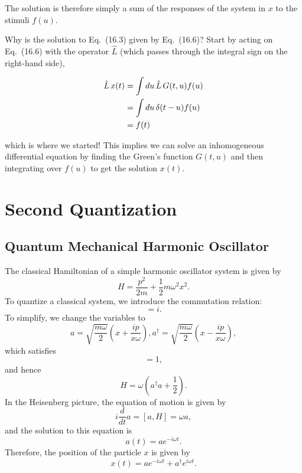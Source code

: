\documentclass[11pt]{article}
\theoremstyle{definition}
\begin{document}
\begin{tcolorbox}[breakable, colback=yellow!20!white, colframe=black, boxrule=1pt]
The solution is therefore simply a sum of the responses of the system in $x$ to the stimuli $f(u)$.

Why is the solution to Eq.~(16.3) given by Eq.~(16.6)? Start by acting on Eq.~(16.6) with the operator $\hat{L}$ (which passes through the integral sign on the right-hand side),

\begin{align}
\hat{L}\,x(t) &= \int du\, \hat{L}\,G(t,u)f(u) \notag \\
&= \int du\, \delta(t-u)f(u)  \\
&= f(t) 
\end{align}

which is where we started! This implies we can solve an inhomogeneous differential equation by finding the Green's function $G(t,u)$ and then integrating over $f(u)$ to get the solution $x(t)$.


\end{tcolorbox}

\section{Second Quantization}
\subsection{Quantum Mechanical Harmonic Oscillator}
The classical Hamiltonian of a simple harmonic oscillator system is given by
\begin{equation}
    H = \frac{p^2}{2m} + \frac{1}{2}m\omega^2x^2
    \label{Eq.Simple Harmonic Oscillator Hamiltonian}.
\end{equation}
To quantize a classical system, we introduce the commutation relation:
\begin{equation}
    [x, p] = i.
    \label{Eq.QM commutation relation}
\end{equation}
To simplify, we change the variables to 
\begin{equation}
    a = \sqrt{\frac{m\omega}{2}}(x + \frac{ip}{x\omega}), a^{\dagger} = \sqrt{\frac{m\omega}{2}}(x - \frac{ip}{x\omega}),
    \label{Eq.Creation and Annihilation}
\end{equation}
which satisfies
\begin{equation}
    [a, a^{\dagger}] = 1,
\end{equation}
and hence
\begin{equation}
    H = \omega(a^{\dagger}a + \frac{1}{2}).
\end{equation}
In the Heisenberg picture, the equation of motion is given by
\begin{equation}
    i\frac{d}{dt}a = [a, H] = \omega a,
\end{equation}
and the solution to this equation is 
\begin{equation}
    a(t) = ae^{-i\omega t}.
\end{equation}
Therefore, the position of the particle $x$ is given by
\begin{equation}
    x(t) = ae^{-i\omega t} + a^\dagger e^{i\omega t}.
\end{equation}
\end{document}
